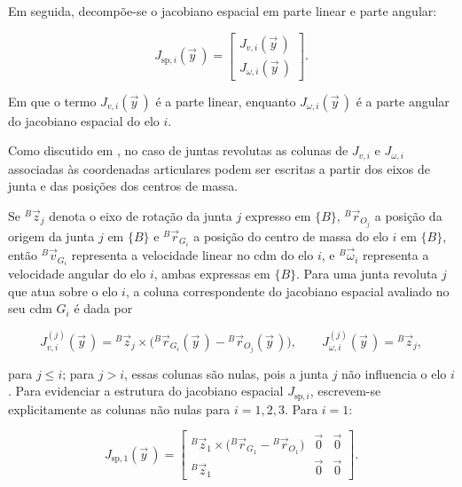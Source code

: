 Em seguida, decompõe-se o jacobiano espacial em parte linear e parte angular:

\begin{equation}
J_{\text{sp},i}(\vec y\,)
=
\begin{bmatrix}
J_{v,i}(\vec y\,) \\
J_{\omega,i}(\vec y\,)
\end{bmatrix}.
\label{eq_jacobianos_vGi2}
\end{equation}

Em que o termo $J_{v,i}(\vec y\, )$ é a parte linear, enquanto
$J_{\omega,i}(\vec y\, )$ é a parte angular do jacobiano espacial do elo $i$.

Como discutido em \cite{sciavicco_siciliano2010}, no caso de juntas
revolutas as colunas de $J_{v,i}$ e $J_{\omega,i}$ associadas às coordenadas
articulares podem ser escritas a partir dos eixos de junta e das posições
dos centros de massa.

Se ${}^{B}\!\vec z_j$ denota o eixo de rotação da junta $j$ expresso em $\{B\}$,
${}^{B}\!\vec r_{O_j}$ a posição da origem da junta $j$ em $\{B\}$ e
${}^{B}\!\vec r_{G_i}$ a posição do centro de massa do elo $i$ em $\{B\}$,
então ${}^{B}\!\vec v_{G_i}$ representa a velocidade linear no \gls{cdm} do elo $i$,
e ${}^{B}\!\vec\omega_i$ representa a velocidade angular do elo $i$, ambas expressas em $\{B\}$.
Para uma junta revoluta $j$ que atua sobre o elo $i$, a coluna correspondente do
jacobiano espacial avaliado no seu \gls{cdm} $G_i$ é dada por

\begin{equation}
J_{v,i}^{(j)}(\vec y\, )
=
{}^{B}\!\vec z_j \times
\bigl({}^{B}\!\vec r_{G_i}(\vec y\, ) - {}^{B}\!\vec r_{O_j}(\vec y\, )\bigr),
\qquad
J_{\omega,i}^{(j)}(\vec y\, )
=
{}^{B}\!\vec z_j,
\label{eq_colunas_J_sp_revoluta}
\end{equation}

para $j\le i$; para $j>i$, essas colunas são nulas, pois a junta $j$ não influencia o elo $i$.
Para evidenciar a estrutura do jacobiano espacial $J_{\text{sp},i}$,
escrevem-se explicitamente as colunas não nulas para $i=1,2,3$.
Para $i=1$:

\begin{equation}
J_{\text{sp},1}(\vec y\, )
=
\begin{bmatrix}
{}^{B}\!\vec z_1 \times \bigl({}^{B}\!\vec r_{G_1}-{}^{B}\!\vec r_{O_1}\bigr) & \vec 0 & \vec 0\\[2pt]
{}^{B}\!\vec z_1 & \vec 0 & \vec 0
\end{bmatrix}.
\label{eq_Jsp_i1}
\end{equation}

